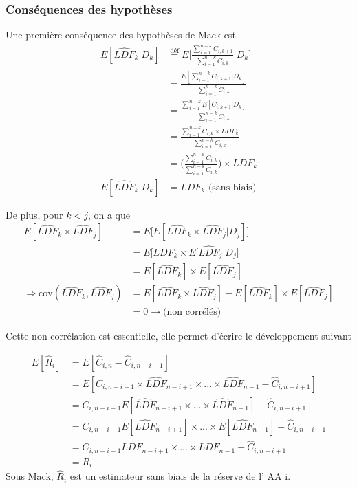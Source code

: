 \subsubsection*{Conséquences des hypothèses}

Une première conséquence des hypothèses de Mack est 
\begin{align*}
E[\widehat{LDF}_k|D_k] &\overset{\text{déf}}{=} E \Bigg[ \frac{\sum_{i =1}^{n-k} C_{i,k+1}}{\sum_{i =1}^{n-k} C_{i,k}} \bigg| D_k \Bigg] \\
&= \frac{E[\sum_{i =1}^{n-k} C_{i,k+1} |D_k] }{\sum_{i =1}^{n-k} C_{i,k}} \\
&= \frac{\sum_{i =1}^{n-k} E[ C_{i,k+1} |D_k] }{\sum_{i =1}^{n-k} C_{i,k}} \\
&= \frac{\sum_{i =1}^{n-k} C_{i,k} \times LDF_k }{\sum_{i =1}^{n-k} C_{i,k}} \\
&= \Bigg( \frac{\sum_{i =1}^{n-k} C_{i,k}}{\sum_{i =1}^{n-k} C_{i,k}} \Bigg) \times LDF_k \\
E[\widehat{LDF}_k|D_k] &= LDF_k \text{ (sans biais)}
\end{align*}


De plus, pour $k<j$, on a que
\begin{align*}
E[\widehat{LDF}_k \times \widehat{LDF}_j] &= E \Big[ E[ \widehat{LDF}_k \times \widehat{LDF}_j | D_j]\Big] \\
&= E \Big[ LDF_k \times E[\widehat{LDF}_j |D_j \Big] \\
&= E [ \widehat{LDF}_k ] \times E[\widehat{LDF}_j] \\
\Rightarrow \text{cov}(\widehat{LDF}_k, \widehat{LDF}_j) &= E[\widehat{LDF}_k \times \widehat{LDF}_j] - E [ \widehat{LDF}_k ] \times E[\widehat{LDF}_j] \\
&= 0 \rightarrow \text{(non corrélés)}
\end{align*}

Cette non-corrélation est essentielle, elle permet d'écrire le développement suivant

\begin{align*}
E[\widehat{R}_i] &= E[\widehat{C}_{i,n} - \widehat{C}_{i, n-i+1}] \\
&= E[C_{i,n - i + 1} \times \widehat{LDF}_{n-i+1} \times ... \times \widehat{LDF}_{n-1} - \widehat{C}_{i, n-i+1}] \\
&= C_{i,n - i + 1} E[\widehat{LDF}_{n-i+1} \times ... \times \widehat{LDF}_{n-1}] - \widehat{C}_{i, n-i+1} \\
&= C_{i,n - i + 1} E[\widehat{LDF}_{n-i+1}] \times ... \times E[\widehat{LDF}_{n-1}] - \widehat{C}_{i, n-i+1} \\
&= C_{i,n - i + 1} LDF_{n-i+1} \times ... \times LDF_{n-1} - \widehat{C}_{i, n-i+1} \\
&= R_i
\end{align*}
Sous Mack, $\widehat{R}_i$ est un estimateur sans biais de la réserve de l' AA i.

